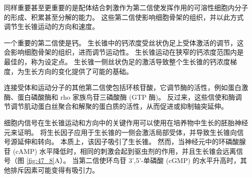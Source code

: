 同样重要甚至更重要的是配体结合刺激作为第二信使发挥作用的可溶性细胞内分子的形成、积累甚至分解的能力。 这些第二信使影响细胞骨架的组织，并以此方式调节生长锥运动的方向和速度。

一个重要的第二信使是钙。 生长锥中的钙浓度受丝状伪足上受体激活的调节，这会影响细胞骨架的组织，进而调节运动性。 生长锥运动在狭窄的钙浓度范围内是最佳的，称为设定点。 生长锥一侧丝状伪足的激活导致整个生长锥的钙浓度梯度，为生长方向的变化提供了可能的基础。

连接受体和运动分子的其他第二信使包括环核苷酸，它调节酶的活性，例如蛋白激酶、蛋白磷酸酶和 rho 家族鸟苷三磷酸酶 (GTP 酶)。 反过来，这些信使和酶调节调节肌动蛋白丝聚合和解聚的蛋白质的活性，从而促进或抑制轴突延伸。

细胞内信号在生长锥运动和方向中的关键作用可以使用在培养物中生长的胚胎神经元来证明。 将生长因子应用于生长锥的一侧会激活局部受体，并导致生长锥向信号源延伸和转向。 本质上，该因子吸引了生长锥。 
然而，当神经元中的环磷酸腺苷 (cAMP) 水平降低时，相同的刺激会起到驱虫剂的作用，并且生长锥会远离信号（图 \ref{fig:47_8}A）。 
当第二信使环鸟苷 3',5'-单磷酸 (cGMP) 的水平升高时，其他排斥因素可能变得有吸引力。

